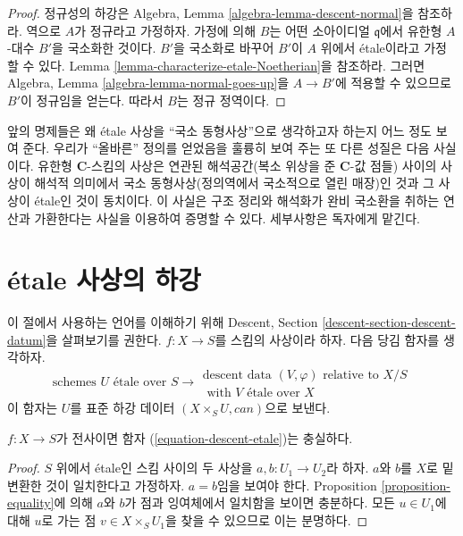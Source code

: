 \begin{proof}
정규성의 하강은 Algebra, Lemma
\ref{algebra-lemma-descent-normal}을 참조하라.
역으로 $A$가 정규라고 가정하자. 가정에 의해 $B$는 어떤 소아이디얼
$\mathfrak q$에서 유한형 $A$-대수 $B'$을 국소화한 것이다.
$B'$을 국소화로 바꾸어 $B'$이 $A$ 위에서 \'etale이라고 가정할 수 있다.
Lemma \ref{lemma-characterize-etale-Noetherian}을 참조하라.
그러면 Algebra, Lemma \ref{algebra-lemma-normal-goes-up}을
$A \to B'$에 적용할 수 있으므로 $B'$이 정규임을 얻는다.
따라서 $B$는 정규 정역이다.
\end{proof}

\noindent
앞의 명제들은 왜 \'etale 사상을 “국소 동형사상”으로 생각하고자 하는지
어느 정도 보여 준다. 우리가 “올바른” 정의를 얻었음을 훌륭히 보여 주는
또 다른 성질은 다음 사실이다. 유한형 $\mathbf{C}$-스킴의 사상은
연관된 해석공간(복소 위상을 준 $\mathbf{C}$-값 점들) 사이의 사상이
해석적 의미에서 국소 동형사상(정의역에서 국소적으로 열린 매장)인 것과
그 사상이 \'etale인 것이 동치이다. 이 사실은 구조 정리와 해석화가
완비 국소환을 취하는 연산과 가환한다는 사실을 이용하여 증명할 수 있다.
세부사항은 독자에게 맡긴다.








\section{\'etale 사상의 하강}
\label{section-descending-etale}

\noindent
이 절에서 사용하는 언어를 이해하기 위해 Descent, Section
\ref{descent-section-descent-datum}을 살펴보기를 권한다.
$f : X \to S$를 스킴의 사상이라 하자. 다음 당김 함자를 생각하자.
\begin{equation}
\label{equation-descent-etale}
\text{schemes }U\text{ \'etale over }S \longrightarrow
\begin{matrix}
\text{descent data }(V, \varphi)\text{ relative to }X/S \\
\text{ with }V\text{ \'etale over }X
\end{matrix}
\end{equation}
이 함자는 $U$를 표준 하강 데이터 $(X \times_S U, can)$으로 보낸다.

\begin{lemma}
\label{lemma-faithful}
$f : X \to S$가 전사이면 함자
(\ref{equation-descent-etale})는 충실하다.
\end{lemma}

\begin{proof}
$S$ 위에서 \'etale인 스킴 사이의 두 사상을
$a, b : U_1 \to U_2$라 하자. $a$와 $b$를 $X$로 밑변환한 것이
일치한다고 가정하자. $a = b$임을 보여야 한다.
Proposition \ref{proposition-equality}에 의해 $a$와 $b$가 점과
잉여체에서 일치함을 보이면 충분하다. 모든 $u \in U_1$에 대해
$u$로 가는 점 $v \in X \times_S U_1$을 찾을 수 있으므로 이는 분명하다.
\end{proof}

